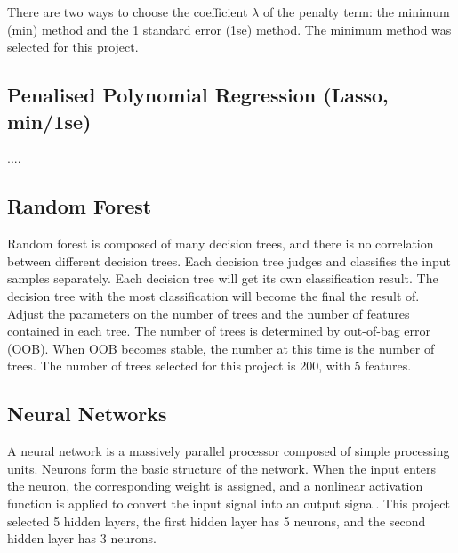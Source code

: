 There are two ways to choose the coefficient $\lambda$ of the penalty term: the minimum (min) method and the 1 standard error (1se) method. The minimum method was selected for this project.



\subsection{Penalised Polynomial Regression (Lasso, min/1se)}
....

\subsection{Random Forest}
Random forest is composed of many decision trees, and there is no correlation between different decision trees. Each decision tree judges and classifies the input samples separately. Each decision tree will get its own classification result. The decision tree with the most classification will become the final the result of. Adjust the parameters on the number of trees and the number of features contained in each tree. The number of trees is determined by out-of-bag error (OOB). When OOB becomes stable, the number at this time is the number of trees\cite{tan2018prediction}. The number of trees selected for this project is 200, with 5 features.

\subsection{Neural Networks}
A neural network is a massively parallel processor composed of simple processing units. Neurons form the basic structure of the network\cite{KO2003271}. When the input enters the neuron, the corresponding weight is assigned, and a nonlinear activation function is applied to convert the input signal into an output signal. This project selected 5 hidden layers, the first hidden layer has 5 neurons, and the second hidden layer has 3 neurons.
